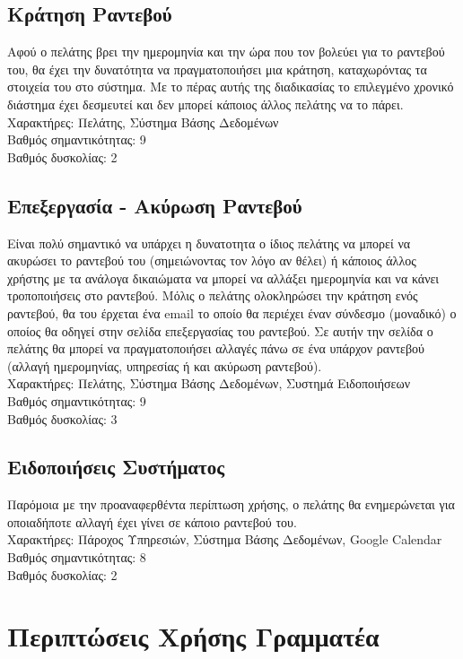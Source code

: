 \documentclass[12pt]{article}
\begin{document}
\subsection{Κράτηση Ραντεβού}
Αφού ο πελάτης βρει την ημερομηνία και την ώρα που τον βολεύει για το ραντεβού του, θα έχει την δυνατότητα να πραγματοποιήσει μια κράτηση, καταχωρόντας τα στοιχεία του στο σύστημα. Με το πέρας αυτής της διαδικασίας το επιλεγμένο χρονικό διάστημα έχει δεσμευτεί και δεν μπορεί κάποιος άλλος πελάτης να το πάρει. 
\\[0.3cm] 
Χαρακτήρες: Πελάτης, Σύστημα Βάσης Δεδομένων
\\[0.3cm]
Βαθμός σημαντικότητας: 9
\\[0.3cm]
Βαθμός δυσκολίας: 2

\subsection{Επεξεργασία - Ακύρωση Ραντεβού}
Είναι πολύ σημαντικό να υπάρχει η δυνατοτητα ο ίδιος πελάτης να μπορεί να ακυρώσει το ραντεβού του (σημειώνοντας τον λόγο αν θέλει) ή κάποιος άλλος χρήστης με τα ανάλογα δικαιώματα να μπορεί να αλλάξει ημερομηνία και να κάνει τροποποιήσεις στο ραντεβού. Μόλις ο πελάτης ολοκληρώσει την κράτηση ενός ραντεβού, θα του έρχεται ένα email το οποίο θα περιέχει έναν σύνδεσμο (μοναδικό) ο οποίος θα οδηγεί στην σελίδα επεξεργασίας του ραντεβού. Σε αυτήν την σελίδα ο πελάτης θα μπορεί να πραγματοποιήσει αλλαγές πάνω σε ένα υπάρχον ραντεβού (αλλαγή ημερομηνίας, υπηρεσίας ή και ακύρωση ραντεβού).
\\[0.3cm] 
Χαρακτήρες: Πελάτης, Σύστημα Βάσης Δεδομένων, Συστημά Ειδοποιήσεων
\\[0.3cm]
Βαθμός σημαντικότητας: 9
\\[0.3cm]
Βαθμός δυσκολίας: 3

\subsection{Ειδοποιήσεις Συστήματος}
Παρόμοια με την προαναφερθέντα περίπτωση χρήσης, ο πελάτης θα ενημερώνεται για οποιαδήποτε αλλαγή έχει γίνει σε κάποιο ραντεβού του. 
\\[0.3cm] 
Χαρακτήρες: Πάροχος Υπηρεσιών, Σύστημα Βάσης Δεδομένων, Google Calendar
\\[0.3cm]
Βαθμός σημαντικότητας: 8
\\[0.3cm]
Βαθμός δυσκολίας: 2

\section {Περιπτώσεις Χρήσης Γραμματέα}
\end{document}
